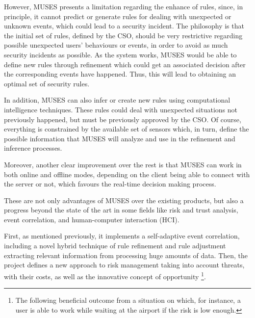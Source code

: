 However, MUSES presents a limitation regarding the enhance of rules,
since, in principle, it cannot predict or generate rules for dealing
with unexpected or unknown events, which could lead to a security
incident. The philosophy is that the initial set of rules, defined by
the CSO, should be very restrictive regarding possible unexpected
users' behaviours or events, in order to avoid as much security
incidents as possible. As the system works, MUSES would be able to
define new rules through refinement which could get an associated
decision after the corresponding events have happened. Thus, this will
lead to obtaining an optimal set of security rules.

In addition, MUSES can also infer or create new rules using computational intelligence techniques. These rules could deal with unexpected situations not previously happened, but must be previously approved by the CSO. Of course, everything is constrained by the available set of sensors which, in turn, define the possible information that MUSES will analyze and use in the refinement and inference processes.

Moreover, another clear improvement over the rest is that MUSES can work in both online and offline modes, depending on the client being able to connect with the server or not, which favours the real-time decision making process.

These are not only advantages of MUSES over the existing products, but also a progress beyond the state of the art in some fields like risk and trust analysis, event correlation, and human-computer interaction (HCI).

First, as mentioned previously, it  implements a self-adaptive event correlation, including a novel hybrid technique of rule refinement and rule adjustment extracting relevant information from processing huge amounts of data. Then, the project defines a new approach to risk management taking into account threats, with their costs, as well as the innovative concept of opportunity \footnote{The following beneficial outcome from a situation on which, for instance, a user is able to work while waiting at the airport if the risk is low enough.}. 

